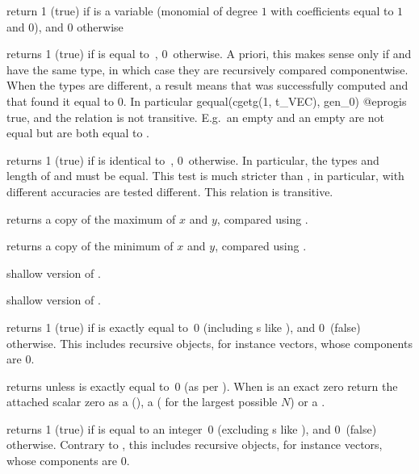  return 1 (true) if  is a variable
(monomial of degree $1$ with  coefficients equal to $1$ and $0$),
and $0$ otherwise

 returns 1 (true) if  is equal
to~, 0~otherwise. A priori, this makes sense only if  and
 have the same type, in which case they are recursively compared
componentwise. When the types are different, a  result
means that  was successfully computed and that
 found it equal to $0$. In particular
\bprog
  gequal(cgetg(1, t_VEC), gen_0)
@eprog\noindent is true, and the relation is not transitive. E.g.~an empty
 and an empty  are not equal but are both equal to
.

 returns 1 (true) if  is identical
to~, 0~otherwise. In particular, the types and length of  and
 must be equal. This test is much stricter than , in
particular,  with different accuracies are tested different. This
relation is transitive.

 returns a copy of the maximum of $x$ and $y$,
compared using .

 returns a copy of the minimum of $x$ and $y$,
compared using .

 shallow version of .

 shallow version of .


 returns 1 (true) if  is exactly equal
to~0 (including s like ), and 0~(false) otherwise.
This includes recursive objects, for instance vectors, whose components are $0$.

 returns  unless  is exactly
equal to~0 (as per ). When  is an exact zero
return the attached scalar zero as a  (),
a  ( for the largest possible $N$) or a
.

 returns 1 (true) if  is equal
to an integer~0 (excluding s like ), and 0~(false)
otherwise. Contrary to , this includes recursive objects, for
instance vectors, whose components are $0$.

